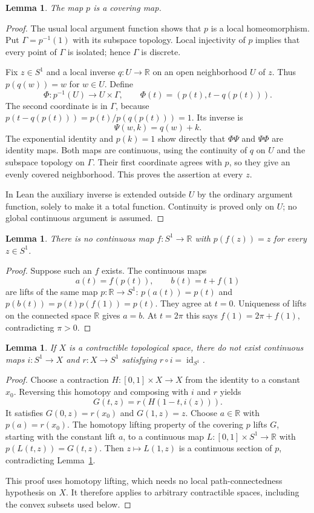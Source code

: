 \documentclass[11pt]{article}
\newtheorem{lemma}[theorem]{Lemma}
\newcommand{\R}{\mathbb R}
\begin{document}
\begin{lemma}\label{lem:cover}
The map $p$ is a covering map.
\end{lemma}
\begin{proof}
The usual local argument function shows that $p$ is a local homeomorphism. Put $\Gamma=p^{-1}(1)$ with its subspace topology. Local injectivity of $p$ implies that every point of $\Gamma$ is isolated; hence $\Gamma$ is discrete.

Fix $z\in S^1$ and a local inverse $q:U\to\R$ on an open neighborhood $U$ of $z$. Thus $p(q(w))=w$ for $w\in U$. Define
\[
 \Phi:p^{-1}(U)\longrightarrow U\times\Gamma,
 \qquad \Phi(t)=(p(t),t-q(p(t))).
\]
The second coordinate is in $\Gamma$, because
$p(t-q(p(t)))=p(t)/p(q(p(t)))=1$. Its inverse is
\[
 \Psi(w,k)=q(w)+k.
\]
The exponential identity and $p(k)=1$ show directly that $\Phi\Psi$ and $\Psi\Phi$ are identity maps. Both maps are continuous, using the continuity of $q$ on $U$ and the subspace topology on $\Gamma$. Their first coordinate agrees with $p$, so they give an evenly covered neighborhood. This proves the assertion at every $z$.

In Lean the auxiliary inverse is extended outside $U$ by the ordinary argument function, solely to make it a total function. Continuity is proved only on $U$; no global continuous argument is assumed.
\end{proof}

\begin{lemma}\label{lem:section}
There is no continuous map $f:S^1\to\R$ with $p(f(z))=z$ for every $z\in S^1$.
\end{lemma}
\begin{proof}
Suppose such an $f$ exists. The continuous maps
\[
 a(t)=f(p(t)),\qquad b(t)=t+f(1)
\]
are lifts of the same map $p:\R\to S^1$: $p(a(t))=p(t)$ and
$p(b(t))=p(t)p(f(1))=p(t)$. They agree at $t=0$. Uniqueness of lifts on the connected space $\R$ gives $a=b$. At $t=2\pi$ this says
$f(1)=2\pi+f(1)$, contradicting $\pi>0$.
\end{proof}

\begin{lemma}\label{lem:retract}
If $X$ is a contractible topological space, there do not exist continuous maps $i:S^1\to X$ and $r:X\to S^1$ satisfying $r\circ i=\operatorname{id}_{S^1}$.
\end{lemma}
\begin{proof}
Choose a contraction $H:[0,1]\times X\to X$ from the identity to a constant $x_0$. Reversing this homotopy and composing with $i$ and $r$ yields
\[
 G(t,z)=r(H(1-t,i(z))).
\]
It satisfies $G(0,z)=r(x_0)$ and $G(1,z)=z$. Choose $a\in\R$ with $p(a)=r(x_0)$. The homotopy lifting property of the covering $p$ lifts $G$, starting with the constant lift $a$, to a continuous map
$L:[0,1]\times S^1\to\R$ with $p(L(t,z))=G(t,z)$. Then $z\mapsto L(1,z)$ is a continuous section of $p$, contradicting Lemma~\ref{lem:section}.

This proof uses homotopy lifting, which needs no local path-connectedness hypothesis on $X$. It therefore applies to arbitrary contractible spaces, including the convex subsets used below.
\end{proof}
\end{document}
